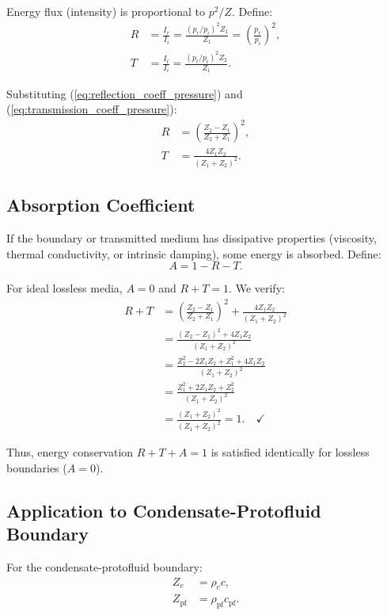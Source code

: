 \documentclass[11pt,a4paper]{article}
\theoremstyle{definition}
\theoremstyle{remark}
\begin{document}
Energy flux (intensity) is proportional to $p^2/Z$. Define:
\begin{align}
R &= \frac{I_r}{I_i} = \frac{(p_r/p_i)^2 Z_1}{Z_1} = \left(\frac{p_r}{p_i}\right)^2, \label{eq:R_definition} \\
T &= \frac{I_t}{I_i} = \frac{(p_t/p_i)^2 Z_2}{Z_1}. \label{eq:T_definition}
\end{align}

Substituting (\ref{eq:reflection_coeff_pressure}) and (\ref{eq:transmission_coeff_pressure}):
\begin{align}
R &= \left(\frac{Z_2 - Z_1}{Z_2 + Z_1}\right)^2, \label{eq:R_formula} \\
T &= \frac{4Z_1 Z_2}{(Z_1 + Z_2)^2}. \label{eq:T_formula}
\end{align}

\subsection{Absorption Coefficient}
\label{sec:absorption}

If the boundary or transmitted medium has dissipative properties (viscosity, thermal conductivity, or intrinsic damping), some energy is absorbed. Define:
\begin{equation}
A = 1 - R - T.
\end{equation}

For ideal lossless media, $A = 0$ and $R + T = 1$. We verify:
\begin{align}
R + T &= \left(\frac{Z_2 - Z_1}{Z_2 + Z_1}\right)^2 + \frac{4Z_1 Z_2}{(Z_1 + Z_2)^2} \nonumber \\
&= \frac{(Z_2 - Z_1)^2 + 4Z_1 Z_2}{(Z_1 + Z_2)^2} \nonumber \\
&= \frac{Z_2^2 - 2Z_1 Z_2 + Z_1^2 + 4Z_1 Z_2}{(Z_1 + Z_2)^2} \nonumber \\
&= \frac{Z_1^2 + 2Z_1 Z_2 + Z_2^2}{(Z_1 + Z_2)^2} \nonumber \\
&= \frac{(Z_1 + Z_2)^2}{(Z_1 + Z_2)^2} = 1. \quad \checkmark
\end{align}

Thus, energy conservation $R + T + A = 1$ is satisfied identically for lossless boundaries ($A=0$).

\subsection{Application to Condensate-Protofluid Boundary}
\label{sec:impedance_application}

For the condensate-protofluid boundary:
\begin{align}
Z_c &= \rho_c c, \\
Z_{\mathrm{pf}} &= \rho_{\mathrm{pf}} c_{\mathrm{pf}}.
\end{align}
\end{document}
